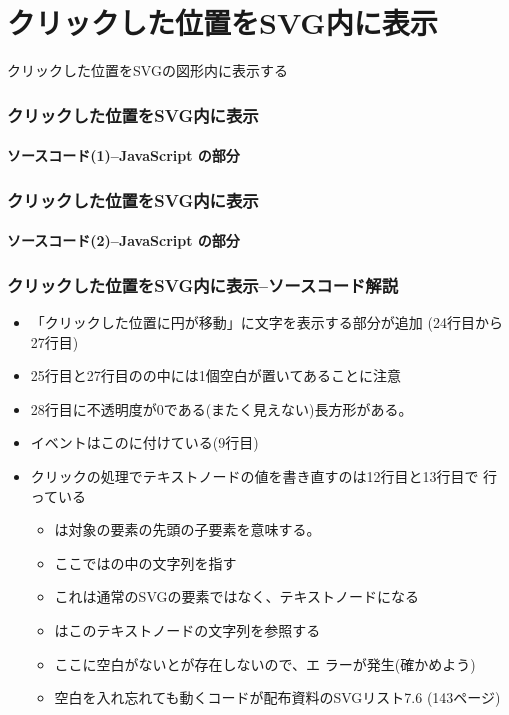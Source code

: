 

\frame{\maketitle}
\section{クリックした位置をSVG内に表示}
\begin{frame}[containsverbatim]
クリックした位置をSVGの図形内に表示する
\end{frame}
\begin{frame}[containsverbatim]
 \frametitle{クリックした位置をSVG内に表示}
 \framesubtitle{ソースコード(1)--JavaScript の部分}
\end{frame}
\begin{frame}[containsverbatim]
 \frametitle{クリックした位置をSVG内に表示}
 \framesubtitle{ソースコード(2)--JavaScript の部分}
\end{frame}
\begin{frame}[containsverbatim]
 \frametitle{クリックした位置をSVG内に表示--ソースコード解説}
 \begin{itemize}
  \item 「クリックした位置に円が移動」に文字を表示する部分が追加
        (24行目から27行目)
  \item 25行目と27行目のの中には1個空白が置いてあることに注意
  \item 28行目に不透明度が$0$である(またく見えない)長方形がある。
  \item {}イベントはこのに付けている(9行目)
  \item クリックの処理でテキストノードの値を書き直すのは12行目と13行目で
        行っている
        \begin{itemize}
         \item {}は対象の要素の先頭の子要素を意味する。
         \item ここではの中の文字列を指す
         \item これは通常のSVGの要素ではなく、テキストノードになる
         \item {}はこのテキストノードの文字列を参照する
         \item ここに空白がないとが存在しないので、エ
               ラーが発生(確かめよう)
         \item 空白を入れ忘れても動くコードが配布資料のSVGリスト7.6%
               (143ページ)
        \end{itemize}
 \end{itemize}
\end{frame}
